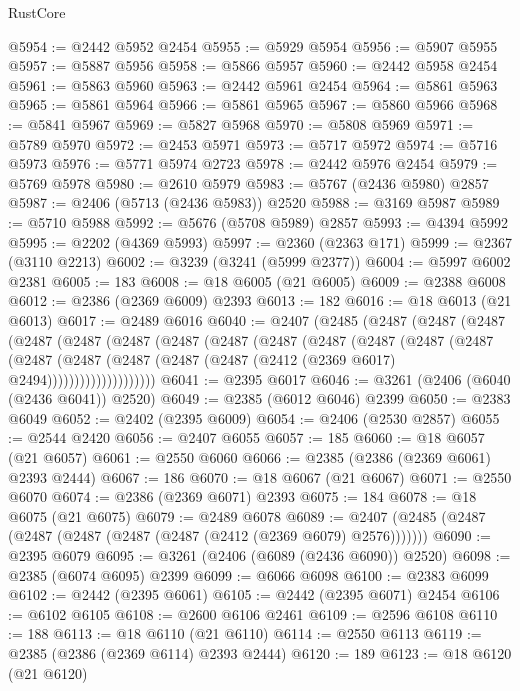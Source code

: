 \begin{lexlean}{RustCore}
\begin{coremodule}
@5954 := @2442 @5952 @2454
@5955 := @5929 @5954
@5956 := @5907 @5955
@5957 := @5887 @5956
@5958 := @5866 @5957
@5960 := @2442 @5958 @2454
@5961 := @5863 @5960
@5963 := @2442 @5961 @2454
@5964 := @5861 @5963
@5965 := @5861 @5964
@5966 := @5861 @5965
@5967 := @5860 @5966
@5968 := @5841 @5967
@5969 := @5827 @5968
@5970 := @5808 @5969
@5971 := @5789 @5970
@5972 := @2453 @5971
@5973 := @5717 @5972
@5974 := @5716 @5973
@5976 := @5771 @5974 @2723
@5978 := @2442 @5976 @2454
@5979 := @5769 @5978
@5980 := @2610 @5979
@5983 := @5767 (@2436 @5980) @2857
@5987 := @2406 (@5713 (@2436 @5983)) @2520
@5988 := @3169 @5987
@5989 := @5710 @5988
@5992 := @5676 (@5708 @5989) @2857
@5993 := @4394 @5992
@5995 := @2202 (@4369 @5993)
@5997 := @2360 (@2363 @171)
@5999 := @2367 (@3110 @2213)
@6002 := @3239 (@3241 (@5999 @2377))
@6004 := @5997 @6002 @2381
@6005 := 183
@6008 := @18 @6005 (@21 @6005)
@6009 := @2388 @6008
@6012 := @2386 (@2369 @6009) @2393
@6013 := 182
@6016 := @18 @6013 (@21 @6013)
@6017 := @2489 @6016
@6040 := @2407
    (@2485
      (@2487
        (@2487
          (@2487
            (@2487
              (@2487
                (@2487
                  (@2487
                    (@2487
                      (@2487
                        (@2487
                          (@2487
                            (@2487
                              (@2487
                                (@2487
                                  (@2487
                                    (@2487
                                      (@2487 (@2487 (@2412 (@2369 @6017) @2494))))))))))))))))))))
@6041 := @2395 @6017
@6046 := @3261 (@2406 (@6040 (@2436 @6041)) @2520)
@6049 := @2385 (@6012 @6046) @2399
@6050 := @2383 @6049
@6052 := @2402 (@2395 @6009)
@6054 := @2406 (@2530 @2857)
@6055 := @2544 @2420
@6056 := @2407 @6055
@6057 := 185
@6060 := @18 @6057 (@21 @6057)
@6061 := @2550 @6060
@6066 := @2385 (@2386 (@2369 @6061) @2393 @2444)
@6067 := 186
@6070 := @18 @6067 (@21 @6067)
@6071 := @2550 @6070
@6074 := @2386 (@2369 @6071) @2393
@6075 := 184
@6078 := @18 @6075 (@21 @6075)
@6079 := @2489 @6078
@6089 := @2407 (@2485 (@2487 (@2487 (@2487 (@2487 (@2487 (@2412 (@2369 @6079) @2576)))))))
@6090 := @2395 @6079
@6095 := @3261 (@2406 (@6089 (@2436 @6090)) @2520)
@6098 := @2385 (@6074 @6095) @2399
@6099 := @6066 @6098
@6100 := @2383 @6099
@6102 := @2442 (@2395 @6061)
@6105 := @2442 (@2395 @6071) @2454
@6106 := @6102 @6105
@6108 := @2600 @6106 @2461
@6109 := @2596 @6108
@6110 := 188
@6113 := @18 @6110 (@21 @6110)
@6114 := @2550 @6113
@6119 := @2385 (@2386 (@2369 @6114) @2393 @2444)
@6120 := 189
@6123 := @18 @6120 (@21 @6120)

\end{coremodule}
\end{lexlean}
